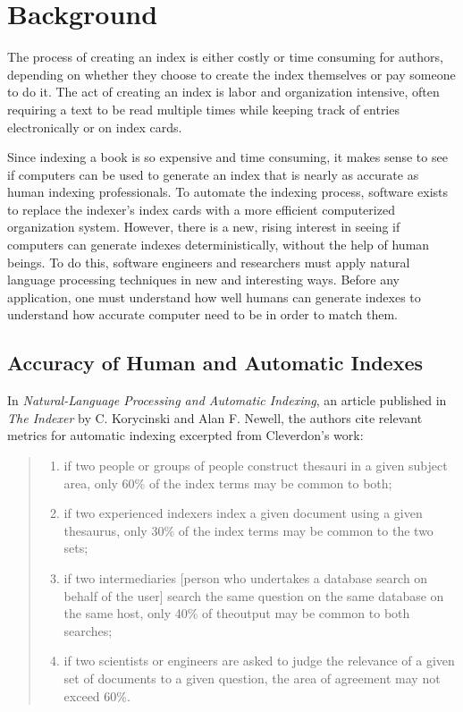 \section{Background}
The process of creating an index is either costly or time consuming for authors, depending on whether they choose to create the index themselves or pay someone to do it.
The act of creating an index is labor and organization intensive, often requiring a text to be read multiple times while keeping track of entries electronically or on index cards.

Since indexing a book is so expensive and time consuming, it makes sense to see if computers can be used to generate an index that is nearly as accurate as human indexing professionals.
To automate the indexing process, software exists to replace the indexer's index cards with a more efficient computerized organization system.
However, there is a new, rising interest in seeing if computers can generate indexes deterministically, without the help of human beings.
To do this, software engineers and researchers must apply natural language processing techniques in new and interesting ways.
Before any application, one must understand how well humans can generate indexes to understand how accurate computer need to be in order to match them.

\subsection{Accuracy of Human and Automatic Indexes}

In {\it Natural-Language Processing and Automatic Indexing}, an article published in {\it The Indexer} by C. Korycinski and Alan F. Newell, the authors cite relevant metrics for automatic indexing excerpted from Cleverdon's work:

\begin{quote}
\begin{enumerate}
\item if two people or groups of people construct thesauri in a given subject area, only 60\% of the index terms may be common to both;
\item if two experienced indexers index a given document using a given thesaurus, only 30\% of the index terms may be common to the two sets;
\item if two intermediaries [person who undertakes a database search on behalf of the user] search the same question on the same database on the same host, only 40\% of theoutput may be common to both searches;
\item if two scientists or engineers are asked to judge the relevance of a given set of documents to a given question, the area of agreement may not exceed 60\%.\cite{automatic-indexing}
\end{enumerate}
\end{quote}

